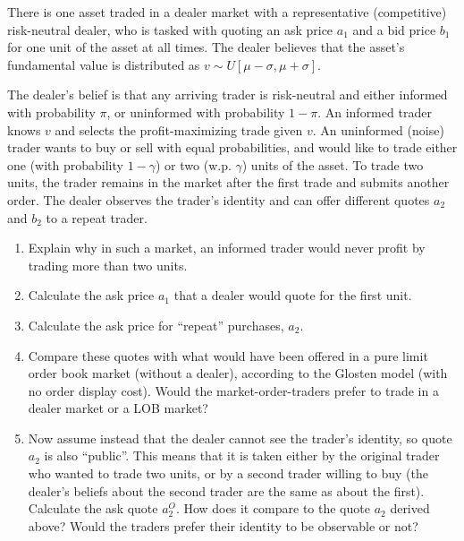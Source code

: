 \documentclass[a4paper]{article}
\newif\ifsolutions
\begin{document}
There is one asset traded in a dealer market with a representative (competitive) risk-neutral dealer, who is tasked with quoting an ask price $a_1$ and a bid price $b_1$ for one unit of the asset at all times. The dealer believes that the asset's fundamental value is distributed as $v \sim U[\mu - \sigma, \mu + \sigma]$.

The dealer's belief is that any arriving trader is risk-neutral and either informed with probability $\pi$, or uninformed with probability $1-\pi$. An informed trader knows $v$ and selects the profit-maximizing trade given $v$. An uninformed (noise) trader wants to buy or sell with equal probabilities, and would like to trade either one (with probability $1-\gamma$) or two (w.p. $\gamma$) units of the asset. To trade two units, the trader remains in the market after the first trade and submits another order. The dealer observes the trader's identity and can offer different quotes $a_2$ and $b_2$ to a repeat trader.

\begin{enumerate}
	\item Explain why in such a market, an informed trader would never profit by trading more than two units.
	\item Calculate the ask price $a_1$ that a dealer would quote for the first unit.
	\item Calculate the ask price for ``repeat'' purchases, $a_2$.
	\item Compare these quotes with what would have been offered in a pure limit order book market (without a dealer), according to the Glosten model (with no order display cost). Would the market-order-traders prefer to trade in a dealer market or a LOB market?
	\item Now assume instead that the dealer cannot see the trader's identity, so quote $a_2$ is also ``public''. This means that it is taken either by the original trader who wanted to trade two units, or by a second trader willing to buy (the dealer's beliefs about the second trader are the same as about the first). Calculate the ask quote $a_2^O$. How does it compare to the quote $a_2$ derived above? Would the traders prefer their identity to be observable or not?
\end{enumerate}


\ifsolutions
\end{document}
